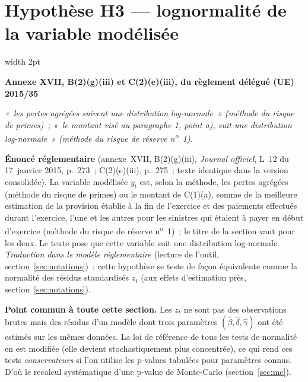 \documentclass[a4paper,11pt]{article}
\newcommand{\reglement}[2]{%
  \par\vspace{2mm}\noindent\begin{minipage}{\linewidth}
  \small\setlength{\parindent}{0pt}
  \textcolor{financeblue}{\vrule width 2pt}\hspace{4mm}%
  \begin{minipage}{\dimexpr\linewidth-7mm\relax}
  \textcolor{financeblue}{\textbf{#1}}
  \par\vspace{2pt}
  {\itshape #2}
  \end{minipage}
  \end{minipage}\par\vspace{3mm}}
\begin{document}
\newpage
\clearpage
\section{Hypothèse H3 --- lognormalité de la variable modélisée}
\label{sec:h3}

\reglement{Annexe XVII, B(2)(g)(iii) et C(2)(e)(iii), du règlement délégué (UE) 2015/35}{«~les
pertes agrégées suivent une distribution log-normale~» (méthode du risque de primes)~; «~le
montant visé au paragraphe 1, point a), suit une distribution log-normale~» (méthode du risque de
réserve n\textsuperscript{o}~1).}

\begin{encadre}
\textbf{Énoncé réglementaire} (annexe~XVII, B(2)(g)(iii), \emph{Journal officiel}, L~12 du
17~janvier 2015, p.~273~; C(2)(e)(iii), p.~275~; texte identique dans la version consolidée). La
variable modélisée $y_t$ est, selon la méthode, les pertes agrégées (méthode du risque de primes)
ou le montant de C(1)(a), somme de la meilleure estimation de la provision établie à la fin de
l'exercice et des paiements effectués durant l'exercice, l'une et les autres pour les sinistres
qui étaient à payer en début d'exercice (méthode du risque de réserve
n\textsuperscript{o}~1)~; le titre de la section vaut pour les deux. Le texte pose que cette
variable suit une distribution log-normale. \emph{Traduction dans le modèle
réglementaire} (lecture de l'outil, section~\ref{sec:notations})~: cette hypothèse se teste de
façon équivalente comme la normalité des résidus standardisés $z_t$ (aux effets d'estimation
près, section~\ref{sec:notations}).
\end{encadre}

\begin{encadre}
\textbf{Point commun à toute cette section.} Les $z_t$ ne sont pas des observations brutes mais
des résidus d'un modèle dont trois paramètres $(\hat\beta, \hat\delta, \hat\gamma)$ ont été
estimés sur les mêmes données. La loi de référence de tous les tests de normalité en est modifiée
(elle devient stochastiquement plus concentrée), ce qui rend ces tests \emph{conservateurs} si
l'on utilise les p-values tabulées pour paramètres connus. D'où le recalcul systématique d'une
p-value de Monte-Carlo (section~\ref{sec:mc}).
\end{encadre}
\end{document}
